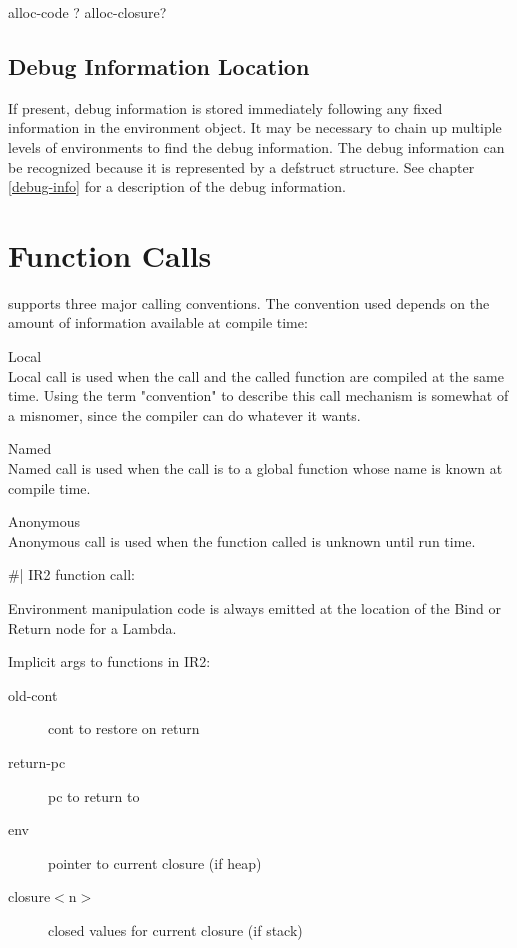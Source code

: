 {\begin{itemize, spread 0, spacing 1}
alloc-code ?
alloc-closure?


\subsection{Debug Information Location}

If present, debug information is stored immediately following any fixed
information in the environment object.  It may be necessary to chain up
multiple levels of environments to find the debug information.  The debug
information can be recognized because it is represented by a defstruct
structure.  See chapter \ref{debug-info} for a description of the debug
information.

		
\section{Function Calls}

\ccl supports three major calling conventions.  The convention used
depends on the amount of information available at compile time:
\begin{description}
Local\\Local call is used when the call and the called function are
compiled at the same time.  Using the term "convention" to describe this
call mechanism is somewhat of a misnomer, since the compiler can do
whatever it wants.

Named\\Named call is used when the call is to a global function whose name
is known at compile time.

Anonymous\\Anonymous call is used when the function called is unknown until
run time.
\end{description}

\#|
IR2 function call:

Environment manipulation code is always emitted at the location of the Bind or
Return node for a Lambda. 

Implicit args to functions in IR2:
\begin{description}
\item[old-cont] cont to restore on return
\item[return-pc] pc to return to
\item[env] pointer to current closure (if heap)
\item[closure$<$n$>$] closed values for current closure (if stack)
\end{description}


\end{itemize, spread 0, spacing 1}}
